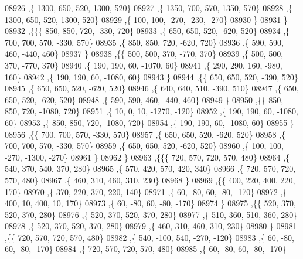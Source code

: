 \begin{DoxyCode}
08926     ,\{  1300,   650,   520,  1300,   520\}
08927     ,\{  1350,   700,   570,  1350,   570\}
08928     ,\{  1300,   650,   520,  1300,   520\}
08929     ,\{   100,   100,  -270,  -230,  -270\}
08930     \}
08931    \}
08932   ,\{\{\{   850,   850,   720,  -330,   720\}
08933     ,\{   650,   650,   520,  -620,   520\}
08934     ,\{   700,   700,   570,  -330,   570\}
08935     ,\{   850,   850,   720,  -620,   720\}
08936     ,\{   590,   590,   460,  -440,   460\}
08937     \}
08938    ,\{\{   500,   500,   370,  -770,   370\}
08939     ,\{   500,   500,   370,  -770,   370\}
08940     ,\{   190,   190,    60, -1070,    60\}
08941     ,\{   290,   290,   160,  -980,   160\}
08942     ,\{   190,   190,    60, -1080,    60\}
08943     \}
08944    ,\{\{   650,   650,   520,  -390,   520\}
08945     ,\{   650,   650,   520,  -620,   520\}
08946     ,\{   640,   640,   510,  -390,   510\}
08947     ,\{   650,   650,   520,  -620,   520\}
08948     ,\{   590,   590,   460,  -440,   460\}
08949     \}
08950    ,\{\{   850,   850,   720, -1080,   720\}
08951     ,\{    10,     0,    10, -1270,  -120\}
08952     ,\{   190,   190,    60, -1080,    60\}
08953     ,\{   850,   850,   720, -1080,   720\}
08954     ,\{   190,   190,    60, -1080,    60\}
08955     \}
08956    ,\{\{   700,   700,   570,  -330,   570\}
08957     ,\{   650,   650,   520,  -620,   520\}
08958     ,\{   700,   700,   570,  -330,   570\}
08959     ,\{   650,   650,   520,  -620,   520\}
08960     ,\{   100,   100,  -270, -1300,  -270\}
08961     \}
08962    \}
08963   ,\{\{\{   720,   570,   720,   570,   480\}
08964     ,\{   540,   370,   540,   370,   280\}
08965     ,\{   570,   420,   570,   420,   340\}
08966     ,\{   720,   570,   720,   570,   480\}
08967     ,\{   460,   310,   460,   310,   230\}
08968     \}
08969    ,\{\{   400,   220,   400,   220,   170\}
08970     ,\{   370,   220,   370,   220,   140\}
08971     ,\{    60,   -80,    60,   -80,  -170\}
08972     ,\{   400,    10,   400,    10,   170\}
08973     ,\{    60,   -80,    60,   -80,  -170\}
08974     \}
08975    ,\{\{   520,   370,   520,   370,   280\}
08976     ,\{   520,   370,   520,   370,   280\}
08977     ,\{   510,   360,   510,   360,   280\}
08978     ,\{   520,   370,   520,   370,   280\}
08979     ,\{   460,   310,   460,   310,   230\}
08980     \}
08981    ,\{\{   720,   570,   720,   570,   480\}
08982     ,\{   540,  -100,   540,  -270,  -120\}
08983     ,\{    60,   -80,    60,   -80,  -170\}
08984     ,\{   720,   570,   720,   570,   480\}
08985     ,\{    60,   -80,    60,   -80,  -170\}

\end{DoxyCode}
